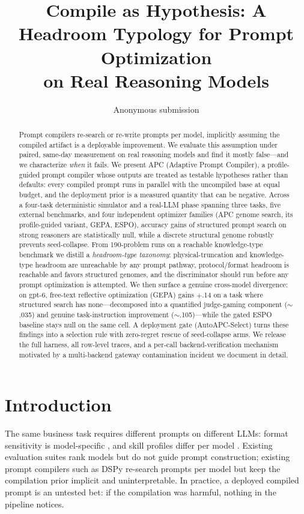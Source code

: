 \documentclass[11pt]{article}
\title{Compile as Hypothesis: A Headroom Typology for Prompt Optimization\\ on Real Reasoning Models}
\author{Anonymous submission\\
}
\begin{document}
\maketitle

\begin{abstract}
Prompt compilers re-search or re-write prompts per model, implicitly assuming the compiled artifact is a deployable improvement. We evaluate this assumption under paired, same-day measurement on real reasoning models and find it mostly false---and we characterize \emph{when} it fails. We present APC (Adaptive Prompt Compiler), a profile-guided prompt compiler whose outputs are treated as testable hypotheses rather than defaults: every compiled prompt runs in parallel with the uncompiled base at equal budget, and the deployment prior is a measured quantity that can be negative. Across a four-task deterministic simulator and a real-LLM phase spanning three tasks, five external benchmarks, and four independent optimizer families (APC genome search, its profile-guided variant, GEPA, ESPO), accuracy gains of structured prompt search on strong reasoners are statistically null, while a discrete structural genome robustly prevents seed-collapse. From 190-problem runs on a reachable knowledge-type benchmark we distill a \emph{headroom-type taxonomy}: physical-truncation and knowledge-type headroom are unreachable by any prompt pathway, protocol/format headroom is reachable and favors structured genomes, and the discriminator should run before any prompt optimization is attempted. We then surface a genuine cross-model divergence: on gpt-6, free-text reflective optimization (GEPA) gains $+$.14 on a task where structured search has none---decomposed into a quantified judge-gaming component ($\sim$.035) and genuine task-instruction improvement ($\sim$.105)---while the gated ESPO baseline stays null on the same cell. A deployment gate (AutoAPC-Select) turns these findings into a selection rule with zero-regret rescue of seed-collapse arms. We release the full harness, all row-level traces, and a per-call backend-verification mechanism motivated by a multi-backend gateway contamination incident we document in detail.
\end{abstract}

\section{Introduction}

The same business task requires different prompts on different LLMs: format sensitivity is model-specific \citep{sclar2024quantifying}, and skill profiles differ per model \citep{chen2023flask,liang2023holistic}. Existing evaluation suites rank models but do not guide prompt construction; existing prompt compilers such as DSPy \citep{khattab2024dspy} re-search prompts per model but keep the compilation prior implicit and uninterpretable. In practice, a deployed compiled prompt is an untested bet: if the compilation was harmful, nothing in the pipeline notices.
\end{document}
